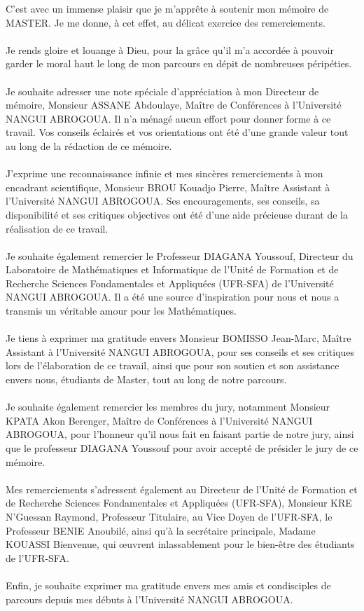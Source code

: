 C'est avec un immense plaisir que je m'apprête à soutenir mon mémoire de MASTER. Je me donne, à cet effet, au délicat exercice des remerciements.\\\\
Je rends gloire et louange à Dieu, pour la grâce qu'il m'a accordée à pouvoir garder le moral haut le long de mon parcours en dépit de nombreuses péripéties.\\\\
Je souhaite adresser une note spéciale d'appréciation à mon Directeur de mémoire, Monsieur ASSANE Abdoulaye, Maître de Conférences à l'Université NANGUI ABROGOUA. Il n'a ménagé aucun effort pour donner forme à ce travail. Vos conseils éclairés et vos orientations ont été d'une grande valeur tout au long de la rédaction de ce mémoire.\\\\
J'exprime une reconnaissance infinie et mes sincères remerciements à mon encadrant scientifique, Monsieur BROU Kouadjo Pierre, Maître Assistant à l'Université NANGUI ABROGOUA. Ses encouragements, ses conseils, sa disponibilité et ses critiques objectives ont été d'une aide précieuse durant de la réalisation de ce travail.\\\\
Je souhaite également remercier le Professeur DIAGANA Youssouf, Directeur du Laboratoire de Mathématiques et Informatique de l'Unité de Formation et de Recherche Sciences Fondamentales et Appliquées (UFR-SFA) de l'Université NANGUI ABROGOUA. Il a été une source d'inspiration pour nous et nous a transmis un véritable amour pour les Mathématiques.\\\\
Je tiens à exprimer ma gratitude envers Monsieur BOMISSO Jean-Marc, Maître Assistant à l'Université NANGUI ABROGOUA, pour ses conseils et ses critiques lors de l'élaboration de ce travail, ainsi que pour son soutien et son assistance envers nous, étudiants de Master, tout au long de notre parcours.\\\\
Je souhaite également remercier les membres du jury, notamment Monsieur KPATA Akon Berenger, Maître de Conférences à l'Université NANGUI ABROGOUA, pour l'honneur qu'il nous fait en faisant partie de notre jury, ainsi que le professeur DIAGANA Youssouf pour avoir accepté de présider le jury de ce mémoire.\\\\
Mes remerciements s'adressent également au Directeur de l'Unité de Formation et de Recherche Sciences Fondamentales et Appliquées (UFR-SFA), Monsieur KRE N'Guessan Raymond, Professeur Titulaire, au Vice Doyen de l'UFR-SFA, le Professeur BENIE Anoubilé, ainsi qu'à la secrétaire principale, Madame KOUASSI Bienvenue, qui œuvrent inlassablement pour le bien-être des étudiants de l'UFR-SFA.\\\\
Enfin, je souhaite exprimer ma gratitude envers mes amis et condisciples de parcours depuis mes débuts à l'Université NANGUI ABROGOUA.
